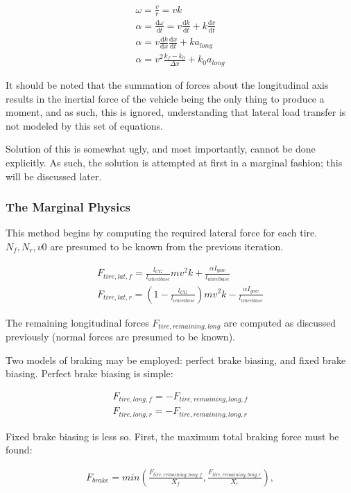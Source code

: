 \documentclass{article}
\def\D{\mathrm{d}}
\begin{document}
\begin{align}
	\omega = \frac{v}{r} = v k \\
	\alpha = \frac{\D \omega}{\D t} = v \frac{\D k}{\D t} + k \frac{\D v}{\D t} \\
	\alpha = v \frac{\D k}{\D x} \frac{\D x}{\D t} + k a_{long} \\
	\alpha = v^2 \frac{k_f - k_0}{\Delta x} + k_0 a_{long}
\end{align}

It should be noted that the summation of forces about the longitudinal axis results in the inertial force of the vehicle being the only thing to produce a moment, and as such, this is ignored, understanding that lateral load transfer is not modeled by this set of equations.

Solution of this is somewhat ugly, and most importantly, cannot be done explicitly. As such, the solution is attempted at first in a marginal fashion; this will be discussed later.

\subsubsection{The Marginal Physics}
This method begins by computing the required lateral force for each tire. $N_f, N_r, v0$ are presumed to be known from the previous iteration.

\begin{align}
	F_{tire,lat,f} = \frac{l_{CG}}{l_{wheelbase}} m v^2 k + \frac{\alpha I_{yaw}}{l_{wheelbase}}  \\ 
	F_{tire,lat,r} = (1-\frac{l_{CG}}{l_{wheelbase}}) m v^2 k - \frac{\alpha I_{yaw}}{l_{wheelbase}}
\end{align}

The remaining longitudinal forces $F_{tire,remaining,long}$ are computed as discussed previously (normal forces are presumed to be known). 

Two models of braking may be employed: perfect brake biasing, and fixed brake biasing. Perfect brake biasing is simple:

\begin{align}
	F_{tire,long,f} = -F_{tire,remaining,long,f} \\
	F_{tire,long,r} = -F_{tire,remaining,long,r}
\end{align}

Fixed brake biasing is less so. First, the maximum total braking force must be found:

\begin{align}
	F_{brake} = min(\frac{F_{tire,remaining,long,f}}{X_{f}}, \frac{F_{tire,remaining,long,r}}{X_{r}}),
\end{align}
\end{document}
